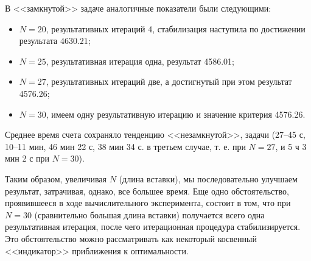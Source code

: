 В <<замкнутой>> задаче аналогичные показатели были следующими:

\begin{itemize}
  \item
  $N=20$, результативных итераций 4, стабилизация наступила по достижении результата $4630.21$;
  \item
  $N=25$, результативная итерация одна, результат 4586.01;
  \item
  $N=27$, результативных итераций две, а достигнутый при этом результат 4576.26;
  \item
  $N=30$, имеем одну результативную итерацию и значение критерия 4576.26.
\end{itemize}

Среднее время счета сохраняло тенденцию <<незамкнутой>>, задачи
(27--45 с, 10--11 мин,
46 мин 22 с, 38 мин 34 с. в третьем случае,
т. е. при $N=27$,
и 5 ч 3 мин 2 с при $N=30$).

Таким образом, увеличивая $N$
(длина вставки),
мы последовательно улучшаем результат,
затрачивая, однако, все большее время.
Еще одно обстоятельство,
проявившееся в ходе вычислительного эксперимента,
состоит в том, что при
$N=30$
(сравнительно большая длина вставки)
получается всего одна результативная итерация,
после чего итерационная процедура стабилизируется.
Это обстоятельство можно рассматривать как некоторый
косвенный <<индикатор>> приближения к оптимальности.
